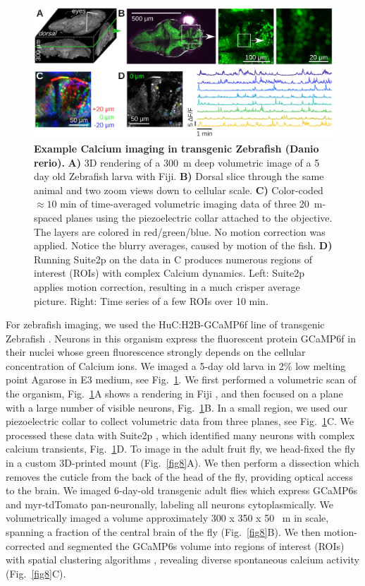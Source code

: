 \documentclass[10pt,letterpaper]{article}
\begin{document}
\begin{figure}[t]
    \includegraphics[width=\textwidth]{fig7.jpg}
    \caption{{\bf Example Calcium imaging in transgenic Zebrafish (Danio rerio).} \textbf{A)} 3D rendering of a 300~\textmu m deep volumetric image of a 5 day old Zebrafish larva with Fiji\cite{Schindelin2019}. \textbf{B)} Dorsal slice through the same animal and two zoom views down to cellular scale. \textbf{C)} Color-coded $\approx10\text{ min}$ of time-averaged volumetric imaging data of three 20~\textmu m-spaced planes using the piezoelectric collar attached to the objective. The layers are colored in red/green/blue. No motion correction was applied. Notice the blurry averages, caused by motion of the fish. \textbf{D)} Running Suite2p on the data in C produces numerous regions of interest (ROIs) with complex Calcium dynamics. Left: Suite2p applies motion correction, resulting in a much crisper average picture. Right: Time series of a few ROIs over 10 min.}
    \label{fig7}
\end{figure}
%
%
For zebrafish imaging, we used the HuC:H2B-GCaMP6f line of transgenic Zebrafish \cite{Cong2017}. Neurons in this organism express the fluorescent protein GCaMP6f in their nuclei whose green fluorescence strongly depends on the cellular concentration of Calcium ions. We imaged a 5-day old larva in 2\% low melting point Agarose in E3 medium, see Fig.~\ref{fig7}. We first performed a volumetric scan of the organism, Fig.~\ref{fig7}A shows a rendering in Fiji \cite{Schindelin2019}, and then focused on a plane with a large number of visible neurons, Fig.~\ref{fig7}B. In a small region, we used our piezoelectric collar to collect volumetric data from three planes, see Fig.~\ref{fig7}C. We processed these data with Suite2p \cite{Pachitariu2016}, which identified many neurons with complex calcium transients, Fig.~\ref{fig7}D.\newline
To image in the adult fruit fly, we head-fixed the fly in a custom 3D-printed mount \cite{Pacheco2021} (Fig.~\ref{fig8}A). We then perform a dissection which removes the cuticle from the back of the head of the fly, providing optical access to the brain. We imaged 6-day-old transgenic adult flies which express GCaMP6s and myr-tdTomato pan-neuronally, labeling all neurons cytoplasmically. We volumetrically imaged a volume approximately 300 x 350 x 50 ~\textmu m in scale, spanning a fraction of the central brain of the fly (Fig.~\ref{fig8}B). We then motion-corrected and segmented the GCaMP6s volume into regions of interest (ROIs) with spatial clustering algorithms \cite{Pacheco2021}, revealing diverse spontaneous calcium activity (Fig.~\ref{fig8}C). 
\end{document}
